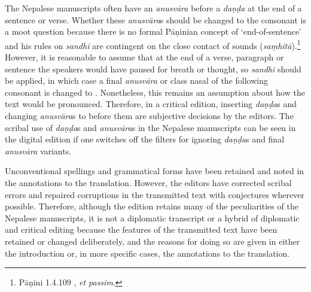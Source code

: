


The Nepalese manuscripts often have an \emph{anusvāra} before a \emph{daṇḍa}
at the end of a sentence or verse. Whether these \emph{anusvāra}s should be
changed to the consonant  is a moot question because there is no formal
Pāṇinian concept of `end-of-sentence' and his rules on \emph{sandhi} are
contingent on the close contact of  sounds (\emph{saṃhitā}).\footnote{Pāṇini
    1.4.109 , \emph{et passim}.} However, it is
    reasonable to assume that at the end of a verse, paragraph or sentence the
    speakers would have paused for breath or thought, so \emph{sandhi} should be
    applied, in which case a final \emph{anusvāra} or class nasal of the following
    consonant is changed to .  Nonetheless, this remains an assumption
    about how the text would be pronounced. Therefore, in a critical edition,
    inserting \emph{daṇḍa}s and changing \emph{anusvāra}s to  before them
    are subjective decisions by the editors. The scribal use of \emph{daṇḍa}s and
    \emph{anusvāra}s in the Nepalese manuscripts can be seen in the digital
    edition if one switches off the filters for ignoring \emph{daṇḍa}s and final
    \emph{anusvāra} variants.

Unconventional spellings and grammatical forms have been retained and noted in 
the annotations to the translation. However, the editors have corrected scribal 
errors and repaired corruptions in the transmitted text with conjectures wherever 
possible. Therefore, although the edition retains many of the peculiarities of the 
Nepalese manuscripts, it is not a diplomatic transcript or a hybrid of diplomatic 
and critical editing because the features of the transmitted text have been 
retained or changed deliberately, and the reasons for doing so are given in either 
the introduction or, in more specific cases, the annotations to the translation.

